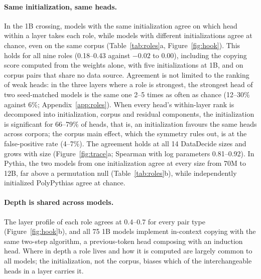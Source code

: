 \documentclass[11pt]{article}
\begin{document}
\paragraph{Same initialization, same heads.}
In the 1B crossing, models with the same initialization agree on which head within a layer takes each role, while models with different initializations agree at chance, even on the same corpus (Table~\ref{tab:roles}a, Figure~\ref{fig:hook}).
This holds for all nine roles (0.18--0.43 against $-0.02$ to $0.00$), including the copying score computed from the weights alone, with five initializations at 1B, and on corpus pairs that share no data source.
Agreement is not limited to the ranking of weak heads: in the three layers where a role is strongest, the strongest head of two seed-matched models is the same one 2--5 times as often as chance (12--30\% against 6\%; Appendix~\ref{app:roles}).
When every head's within-layer rank is decomposed into initialization, corpus and residual components, the initialization is significant for 66--79\% of heads, that is, an initialization favours the same heads across corpora; the corpus main effect, which the symmetry rules out, is at the false-positive rate (4--7\%).
The agreement holds at all 14 DataDecide sizes and grows with size (Figure~\ref{fig:trace}a; Spearman with log parameters 0.81--0.92).
In Pythia, the two models from one initialization agree at every size from 70M to 12B, far above a permutation null (Table~\ref{tab:roles}b), while independently initialized PolyPythias agree at chance.

\paragraph{Depth is shared across models.}
The layer profile of each role agrees at 0.4--0.7 for every pair type (Figure~\ref{fig:hook}b), and all 75 1B models implement in-context copying with the same two-step algorithm, a previous-token head composing with an induction head.
Where in depth a role lives and how it is computed are largely common to all models; the initialization, not the corpus, biases which of the interchangeable heads in a layer carries it.
\end{document}

